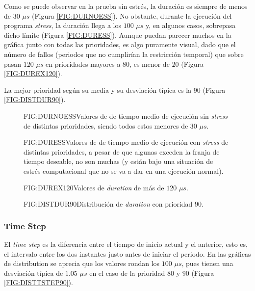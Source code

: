 Como se puede observar en la prueba sin estrés, la duración es siempre de menos de $30$ $\mu s$ (Figura \ref{FIG:DURNOESS}).  No obstante, durante la ejecución del programa \textit{stress}, la duración llega a los $100$ $\mu s$ y, en algunos casos, sobrepasa dicho límite (Figura \ref{FIG:DURESS}). Aunque puedan parecer muchos en la gráfica junto con todas las prioridades, es algo puramente visual, dado que el número de fallos (periodos que no cumplirían la restricción temporal) que sobre pasan $120$ $\mu s$ en prioridades mayores a $80$, es menor de $20$ (Figura \ref{FIG:DUREX120}).

La mejor prioridad según su media y su desviación típica es la $90$ (Figura \ref{FIG:DISTDUR90}).

\begin{figure}[Duration sin estrés]{FIG:DURNOESS}{Valores de de tiempo medio de ejecución sin \textit{stress} de distintas prioridades, siendo todos estos menores de $30$ $\mu s$.}
\end{figure}

\begin{figure}[Duration con estrés]{FIG:DURESS}{Valores de de tiempo medio de ejecución con \textit{stress} de distintas prioridades, a pesar de que algunas exceden la franja de tiempo deseable, no son muchas (y están bajo una situación de estrés computacional que no se va a dar en una ejecución normal).}
\end{figure}

\begin{figure}[Número de duration mayor que 120]{FIG:DUREX120}{Valores de \textit{duration} de más de $120$ $\mu s$.}
\end{figure}

\begin{figure}[Distribución de duration con prioridad 90]{FIG:DISTDUR90}{Distribución de \textit{duration} con prioridad $90$.}
\end{figure}



\subsubsection{Time Step\label{SSS:TIMESTEP}}


El \textit{time step} es la diferencia entre el tiempo de inicio actual y el anterior, esto es, el intervalo entre los dos instantes justo antes de iniciar el periodo. En las gráficas de distribution se aprecia que los valores rondan los $100$ $\mu s$, pues tienen una desviación típica de $1.05$ $\mu s$ en el caso de la prioridad $80$ y $90$ (Figura \ref{FIG:DISTTSTEP90}).

